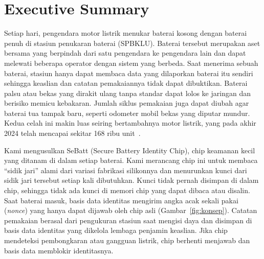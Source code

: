 \documentclass[11pt,a4paper]{article}
\begin{document}
\setcounter{page}{1}

\section{Executive Summary}

Setiap hari, pengendara motor listrik menukar baterai kosong dengan baterai penuh di stasiun penukaran baterai (SPBKLU). Baterai tersebut merupakan aset bersama yang berpindah dari satu pengendara ke pengendara lain dan dapat melewati beberapa operator dengan sistem yang berbeda. Saat menerima sebuah baterai, stasiun hanya dapat membaca data yang dilaporkan baterai itu sendiri sehingga keaslian dan catatan pemakaiannya tidak dapat dibuktikan. Baterai palsu atau bekas yang dirakit ulang tanpa standar dapat lolos ke jaringan dan berisiko memicu kebakaran. Jumlah siklus pemakaian juga dapat diubah agar baterai tua tampak baru, seperti odometer mobil bekas yang diputar mundur. Kedua celah ini makin luas seiring bertambahnya motor listrik, yang pada akhir 2024 telah mencapai sekitar 168 ribu unit~\cite{ruptl}.

Kami mengusulkan SeBatt (Secure Battery Identity Chip), chip keamanan kecil yang ditanam di dalam setiap baterai. Kami merancang chip ini untuk membaca ``sidik jari'' alami dari variasi fabrikasi silikonnya dan menurunkan kunci dari sidik jari tersebut setiap kali dibutuhkan. Kunci tidak pernah disimpan di dalam chip, sehingga tidak ada kunci di memori chip yang dapat dibaca atau disalin. Saat baterai masuk, basis data identitas mengirim angka acak sekali pakai (\emph{nonce}) yang hanya dapat dijawab oleh chip asli (Gambar~\ref{fig:konsep}). Catatan pemakaian berasal dari pengukuran stasiun saat mengisi daya dan disimpan di basis data identitas yang dikelola lembaga penjamin keaslian. Jika chip mendeteksi pembongkaran atau gangguan listrik, chip berhenti menjawab dan basis data memblokir identitasnya.
\end{document}
